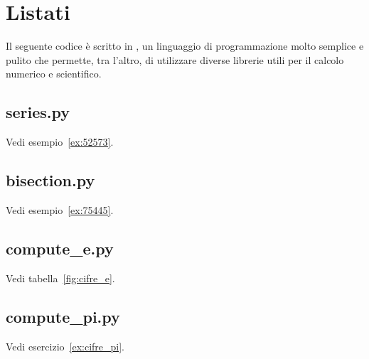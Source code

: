 \appendix
\chapter{Listati}

Il seguente codice è scritto in , un linguaggio di programmazione
molto semplice e pulito che permette, tra l'altro, di utilizzare diverse librerie
utili per il calcolo numerico e scientifico.


\section{series.py}

Vedi esempio~\ref{ex:52573}.
\label{code:series}



\section{bisection.py}

Vedi esempio~\ref{ex:75445}.
\label{code:bisection}



\section{compute\_e.py}

Vedi tabella~\ref{fig:cifre_e}.
\label{code:compute_e}


\section{compute\_pi.py}

Vedi esercizio~\ref{ex:cifre_pi}.
\label{code:compute_pi}


